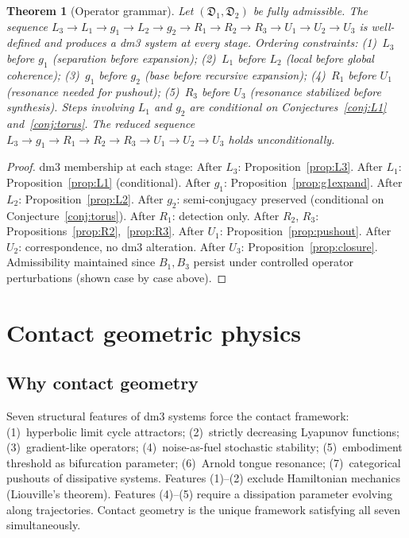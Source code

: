 \documentclass[12pt, oneside]{book}
\theoremstyle{plain}
\newtheorem{theorem}{Theorem}[section]
\theoremstyle{definition}
\theoremstyle{remark}
\newcommand{\dm}{\mathfrak{D}}
\begin{document}
\begin{theorem}[Operator grammar]\label{thm:grammar}
Let $(\dm_1,\dm_2)$ be fully admissible. The sequence
$L_3\to L_1\to g_1\to L_2\to g_2\to R_1\to R_2\to R_3\to U_1\to U_2\to U_3$
is well-defined and produces a dm3 system at every stage.
Ordering constraints:
(1)~$L_3$ before $g_1$ (separation before expansion);
(2)~$L_1$ before $L_2$ (local before global coherence);
(3)~$g_1$ before $g_2$ (base before recursive expansion);
(4)~$R_1$ before $U_1$ (resonance needed for pushout);
(5)~$R_3$ before $U_3$ (resonance stabilized before synthesis).
Steps involving $L_1$ and $g_2$ are conditional on
Conjectures~\ref{conj:L1} and~\ref{conj:torus}.
The reduced sequence $L_3\to g_1\to R_1\to R_2\to R_3\to U_1\to U_2\to U_3$
holds unconditionally.
\end{theorem}

\begin{proof}
dm3 membership at each stage:
After $L_3$: Proposition~\ref{prop:L3}.
After $L_1$: Proposition~\ref{prop:L1} (conditional).
After $g_1$: Proposition~\ref{prop:g1expand}.
After $L_2$: Proposition~\ref{prop:L2}.
After $g_2$: semi-conjugacy preserved (conditional on Conjecture~\ref{conj:torus}).
After $R_1$: detection only.
After $R_2$, $R_3$: Propositions~\ref{prop:R2},~\ref{prop:R3}.
After $U_1$: Proposition~\ref{prop:pushout}.
After $U_2$: correspondence, no dm3 alteration.
After $U_3$: Proposition~\ref{prop:closure}.
Admissibility maintained since $B_1,B_3$ persist under controlled
operator perturbations (shown case by case above).
\end{proof}

\section{Contact geometric physics}\label{sec:contact}

\subsection{Why contact geometry}

Seven structural features of dm3 systems force the contact framework:
(1)~hyperbolic limit cycle attractors; (2)~strictly decreasing Lyapunov
functions; (3)~gradient-like operators; (4)~noise-as-fuel stochastic
stability; (5)~embodiment threshold as bifurcation parameter;
(6)~Arnold tongue resonance; (7)~categorical pushouts of dissipative
systems. Features (1)--(2) exclude Hamiltonian mechanics (Liouville's
theorem). Features (4)--(5) require a dissipation parameter evolving
along trajectories. Contact geometry is the unique framework satisfying
all seven simultaneously.
\end{document}
